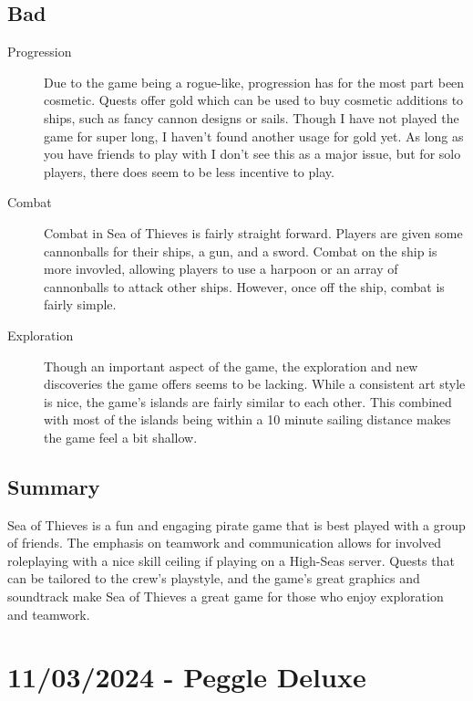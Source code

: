 \documentclass{article}
\begin{document}
\subsection{Bad}
\begin{description}
      \item[Progression] Due to the game being a rogue-like, progression has for
            the most part been cosmetic. Quests offer gold which can be used to buy
            cosmetic additions to ships, such as fancy cannon designs or sails.
            Though I have not played the game for super long, I haven't found
            another usage for gold yet. As long as you have friends to play with
            I don't see this as a major issue, but for solo players, there does
            seem to be less incentive to play.
      \item[Combat] Combat in Sea of Thieves is fairly straight forward. Players
            are given some cannonballs for their ships, a gun, and a sword.
            Combat on the ship is more invovled, allowing players to use a
            harpoon or an array of cannonballs to attack other ships. However,
            once off the ship, combat is fairly simple.
      \item[Exploration] Though an important aspect of the game, the exploration
            and new discoveries the game offers seems to be lacking. While a
            consistent art style is nice, the game's islands are fairly similar to
            each other. This combined with most of the islands being within a 10
            minute sailing distance makes the game feel a bit shallow.
\end{description}

\subsection{Summary}
Sea of Thieves is a fun and engaging pirate game that is best played with a
group of friends. The emphasis on teamwork and communication allows for involved
roleplaying with a nice skill ceiling if playing on a High-Seas server. Quests
that can be tailored to the crew's playstyle, and the game's great graphics and
soundtrack make Sea of Thieves a great game for those who enjoy exploration and
teamwork.

\pagebreak

\section{11/03/2024 - Peggle Deluxe}
\end{document}
